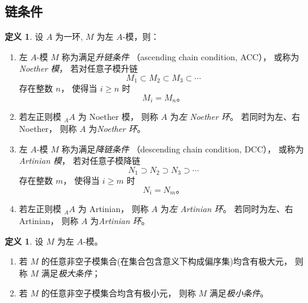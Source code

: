 \documentclass[11pt]{article}
\theoremstyle{plain}
\theoremstyle{definition}
\newtheorem{definition}[theorem]{定义}
\theoremstyle{remark}
\begin{document}
\subsection{链条件}
\begin{definition}
    设 $A$ 为一环, $M$ 为左 $A$-模，则：
    \begin{enumerate}
        \item
              左 $A$-模 $M$ 称为满足\emph{升链条件}
              （ascending chain condition, ACC），
              或称为\emph{Noether 模}，
              若对任意子模升链
              \[
                  M_1\subset M_2\subset M_3\subset\cdots
              \]
              存在整数 $n$，
              使得当 $i\ge n$ 时
              \[
                  M_i=M_n。
              \]

        \item
              若左正则模 ${}_A A$ 为 Noether 模，
              则称 $A$ 为\emph{左 Noether 环}。
              若同时为左、右 Noether，
              则称 $A$ 为\emph{Noether 环}。

        \item
              左 $A$-模 $M$ 称为满足\emph{降链条件}
              （descending chain condition, DCC），
              或称为\emph{Artinian 模}，
              若对任意子模降链
              \[
                  N_1\supset N_2\supset N_3\supset\cdots
              \]
              存在整数 $m$，
              使得当 $i\ge m$ 时
              \[
                  N_i=N_m。
              \]

        \item
              若左正则模 ${}_A A$ 为 Artinian，
              则称 $A$ 为\emph{左 Artinian 环}。
              若同时为左、右 Artinian，
              则称 $A$ 为\emph{Artinian 环}。
    \end{enumerate}
\end{definition}

\begin{definition}
    设 $M$ 为左 $A$-模。
    \begin{enumerate}
        \item
              若 $M$ 的任意非空子模集合(在集合包含意义下构成偏序集)均含有极大元，
              则称 $M$ 满足\emph{极大条件}；
        \item
              若 $M$ 的任意非空子模集合均含有极小元，
              则称 $M$ 满足\emph{极小条件}。
    \end{enumerate}
\end{definition}
\end{document}
